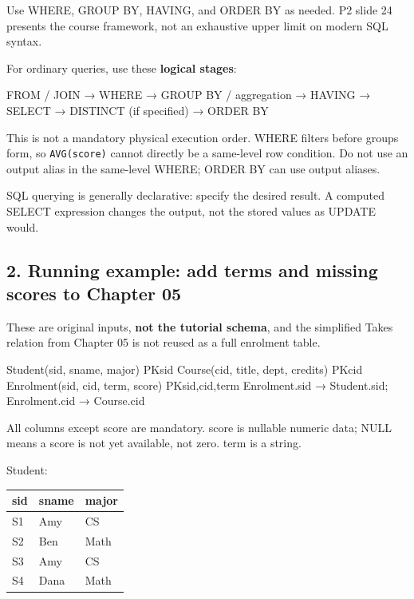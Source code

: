 Use WHERE, GROUP BY, HAVING, and ORDER BY as needed. P2 slide 24 presents the course framework, not an exhaustive upper limit on modern SQL syntax.

For ordinary queries, use these \textbf{logical stages}:

\begin{StudyCode}
FROM / JOIN → WHERE → GROUP BY / aggregation → HAVING
            → SELECT → DISTINCT (if specified) → ORDER BY
\end{StudyCode}

This is not a mandatory physical execution order. WHERE filters before groups form, so \texttt{AVG(\allowbreak{}score)\allowbreak{}} cannot directly be a same-level row condition. Do not use an output alias in the same-level WHERE; ORDER BY can use output aliases.

SQL querying is generally declarative: specify the desired result. A computed SELECT expression changes the output, not the stored values as UPDATE would.

\subsection{2. Running example: add terms and missing scores to Chapter 05}\label{06_sql_queries_en-running-example-add-terms-and-missing-scores-to-chapter-05}

These are original inputs, \textbf{not the tutorial schema}, and the simplified Takes relation from Chapter 05 is not reused as a full enrolment table.

\begin{StudyCode}
Student(sid, sname, major)                 PK{sid}
Course(cid, title, dept, credits)          PK{cid}
Enrolment(sid, cid, term, score)           PK{sid,cid,term}
Enrolment.sid → Student.sid; Enrolment.cid → Course.cid
\end{StudyCode}

All columns except score are mandatory. score is nullable numeric data; NULL means a score is not yet available, not zero. term is a string.

Student:

\begin{longtable}[]{@{}lll@{}}
\toprule\noalign{}
sid & sname & major \\
\midrule\noalign{}
\endhead
\bottomrule\noalign{}
\endlastfoot
S1 & Amy & CS \\
S2 & Ben & Math \\
S3 & Amy & CS \\
S4 & Dana & Math \\
\end{longtable}

